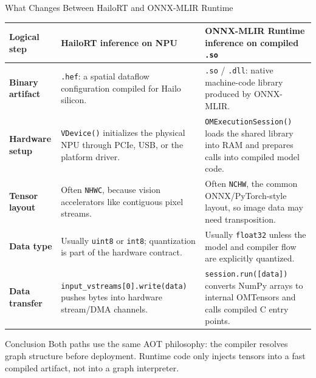 \documentclass[aspectratio=169,10pt]{beamer}
\newcommand{\code}[1]{\texttt{\footnotesize #1}}
\newcommand{\edgeword}[1]{\textcolor{red!75!black}{\textbf{#1}}}
\begin{document}
\begin{frame}{What Changes Between HailoRT and ONNX-MLIR Runtime}
  \scriptsize
  \begin{tabularx}{\textwidth}{@{}lXX@{}}
    \toprule
    Logical step & HailoRT inference on NPU & ONNX-MLIR Runtime inference on compiled \code{.so} \\
    \midrule
    \edgeword{Binary artifact} &
      \code{.hef}: a spatial dataflow configuration compiled for Hailo silicon. &
      \code{.so} / \code{.dll}: native machine-code library produced by ONNX-MLIR. \\
    \edgeword{Hardware setup} &
      \code{VDevice()} initializes the physical NPU through PCIe, USB, or the platform driver. &
      \code{OMExecutionSession()} loads the shared library into RAM and prepares calls into compiled model code. \\
    \edgeword{Tensor layout} &
      Often \code{NHWC}, because vision accelerators like contiguous pixel streams. &
      Often \code{NCHW}, the common ONNX/PyTorch-style layout, so image data may need transposition. \\
    \edgeword{Data type} &
      Usually \code{uint8} or \code{int8}; quantization is part of the hardware contract. &
      Usually \code{float32} unless the model and compiler flow are explicitly quantized. \\
    \edgeword{Data transfer} &
      \code{input\_vstreams[0].write(data)} pushes bytes into hardware stream/DMA channels. &
      \code{session.run([data])} converts NumPy arrays to internal OMTensors and calls compiled C entry points. \\
    \bottomrule
  \end{tabularx}

  \vspace{0.45em}
  \begin{block}{Conclusion}
    Both paths use the same AOT philosophy: the compiler resolves graph structure before deployment. Runtime code only injects tensors into a fast compiled artifact, not into a graph interpreter.
  \end{block}
\end{frame}
\end{document}
